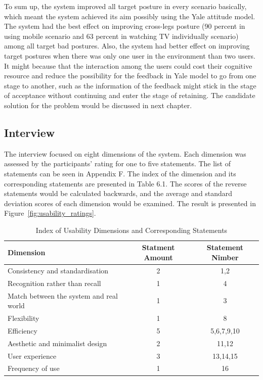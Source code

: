 To sum up, the system improved all target posture in every scenario basically, which meant the system achieved its aim possibly using the Yale attitude model. The system had the best effect on improving cross-legs posture (90 percent in using mobile scenario and 63 percent in watching TV individually scenario) among all target bad postures. Also, the system had better effect on improving target postures when there was only one user in the environment than two users. It might because that the interaction among the users could cost their cognitive resource and reduce the possibility for the feedback in Yale model to go from one stage to another, such as the information of the feedback might stick in the stage of acceptance without continuing and enter the stage of retaining. The candidate solution for the problem would be discussed in next chapter.

\subsection{Interview}
The interview focused on eight dimensions of the system. Each dimension was assessed by the participants’ rating for one to five statements. The list of statements can be seen in Appendix F. The index of the dimension and its corresponding statements are presented in Table 6.1. The scores of the reverse statements would be calculated backwards, and the average and standard deviation scores of each dimension would be examined. The result is presented in Figure~\ref{fig:usability_ratings}.

\begin{table}[ht]
\centering
\begin{tabular}{l c c}
Dimension&Statment Amount&Statement Nimber\\
\hline
Consistency and standardisation&2&1,2\\
Recognition rather than recall&1&4\\
Match between the system and real world&1&3\\ 
Flexibility&1&8\\
Efficiency&5&5,6,7,9,10\\ 
Aesthetic and minimalist design&2&11,12 \\
User experience&3&13,14,15\\
Frequency of use&1&16\\
[1ex]
\hline
\end{tabular}
\label{table:nonlin}
\caption{Index of Usability Dimensions and Corresponding Statements}
\end{table}

